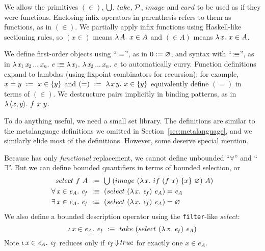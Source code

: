 We allow the primitives $(\in)$, $\textstyle\bigcup$, $take$, $\mathcal{P}$, $image$ and $card$ to be used as if they were functions. Enclosing infix operators in parenthesis refers to them as functions, as in $(\in)$. We partially apply infix functions using Haskell-like sectioning rules, so $(x \in)$ means $\lambda\mspace{2mu}{A}\ldotp\, x \in A$ and $(\in A)$ means $\lambda\mspace{2mu}{x}\ldotp\, x \in A$.

We define first-order objects using ``$:=$'', as in $0 := \varnothing$, and syntax with ``$:\equiv$'', as in
$\lambda\mspace{2mu}{\mathit{x}_1\,\mathit{x}_2\,...\,\mathit{x_n}}\ldotp\, \mathit{e} :\equiv \lambda\mspace{2mu}{\mathit{x}_1}\ldotp\, \lambda\mspace{2mu}{\mathit{x}_2\,...\,\mathit{x_n}}\ldotp\, \mathit{e}$ to automatically curry.
Function definitions expand to lambdas (using fixpoint combinators for recursion); for example, $x = y \ :=\ x \in \{{y}\}$ and $(=)\ :=\ \lambda\mspace{2mu}{x\,y}\ldotp\, x \in \{{y}\}$ equivalently define $(=)$ in terms of $(\in)$.
We destructure pairs implicitly in binding patterns, as in $\lambda\mspace{2mu}{\langle{x,y}\rangle}\ldotp\, f~x~y$.


To do anything useful, we need a small set library. The definitions are similar to the metalanguage definitions we omitted in Section~\ref{sec:metalanguage}, and we similarly elide most of the \targetlang definitions. However, some deserve special mention.

Because \targetlang has only \emph{functional} replacement, we cannot define unbounded ``$\forall$'' and ``$\exists$''. But we can define bounded quantifiers in terms of bounded selection, or
\begin{equation}
\begin{aligned}
	select~f~A &\ \objdef\ \U~(image~(\fun{x} if~(f~x)~\set{x}~\lemptyset)~A) \\
	\Forall{\mathit{x} \in \mathit{e_A}} \mathit{e_f} &\ \objstx\ (select~(\fun{\mathit{x}} \mathit{e_f})~\mathit{e_A}) = \mathit{e_A} \\
	\Exists{\mathit{x} \in \mathit{e_A}} \mathit{e_f} &\ \objstx\ (select~(\fun{\mathit{x}} \mathit{e_f})~\mathit{e_A}) = \emptyset \\
\end{aligned}
\end{equation}
We also define a bounded description operator using the \texttt{filter}-like $select$:
\begin{equation}
	\iota\,{\mathit{x} \in \mathit{e_A}}\ldotp\, \mathit{e_f}\ :\equiv\ take~(select~(\lambda\mspace{2mu}{\mathit{x}}\ldotp\, \mathit{e_f})~\mathit{e_A})
\end{equation}
Note $\iota\,{\mathit{x} \in \mathit{e_A}}\ldotp\, \mathit{e_f}$ reduces only if $\mathit{e_f} \operatorname{\Downarrow} true$ for exactly one $\mathit{x} \in \mathit{e_A}$.

